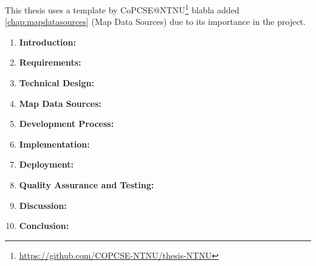 This thesis uses a template by CoPCSE@NTNU\footnote{\url{https://github.com/COPCSE-NTNU/thesis-NTNU}} blabla added \autoref{chap:mapdatasources} (Map Data Sources) due to its importance in the project.

\begin{enumerate}
    \item \textbf{Introduction:}
    \item \textbf{Requirements:}
    \item \textbf{Technical Design:}
    \item \textbf{Map Data Sources:}
    \item \textbf{Development Process:}
    \item \textbf{Implementation:}
    \item \textbf{Deployment:}
    \item \textbf{Quality Assurance and Testing:}
    \item \textbf{Discussion:}
    \item \textbf{Conclusion:}
\end{enumerate}
